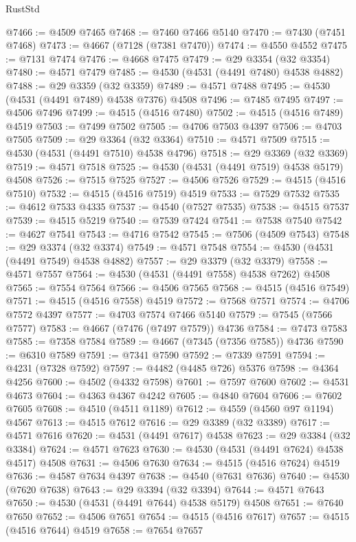 \begin{lexlean}{RustStd}
\begin{coremodule}
{\begin{coremodule}
{{{{{{{{{{{{{{{{{{{{{{{{{{{{{{{{{{{{{{{{{{{{{{{{{{{{{{{@7466 := @4509 @7465
@7468 := @7460 @7466 @5140
@7470 := @7430 (@7451 @7468)
@7473 := @4667 (@7128 (@7381 @7470))
@7474 := @4550 @4552
@7475 := @7131 @7474
@7476 := @4668 @7475
@7479 := @29 @3354 (@32 @3354)
@7480 := @4571 @7479
@7485 := @4530 (@4531 (@4491 @7480) @4538 @4882)
@7488 := @29 @3359 (@32 @3359)
@7489 := @4571 @7488
@7495 := @4530 (@4531 (@4491 @7489) @4538 @7376) @4508
@7496 := @7485 @7495
@7497 := @4506 @7496
@7499 := @4515 (@4516 @7480)
@7502 := @4515 (@4516 @7489) @4519
@7503 := @7499 @7502
@7505 := @4706 @7503 @4397
@7506 := @4703 @7505
@7509 := @29 @3364 (@32 @3364)
@7510 := @4571 @7509
@7515 := @4530 (@4531 (@4491 @7510) @4538 @4796)
@7518 := @29 @3369 (@32 @3369)
@7519 := @4571 @7518
@7525 := @4530 (@4531 (@4491 @7519) @4538 @5179) @4508
@7526 := @7515 @7525
@7527 := @4506 @7526
@7529 := @4515 (@4516 @7510)
@7532 := @4515 (@4516 @7519) @4519
@7533 := @7529 @7532
@7535 := @4612 @7533 @4335
@7537 := @4540 (@7527 @7535)
@7538 := @4515 @7537
@7539 := @4515 @5219
@7540 := @7539 @7424
@7541 := @7538 @7540
@7542 := @4627 @7541
@7543 := @4716 @7542
@7545 := @7506 (@4509 @7543)
@7548 := @29 @3374 (@32 @3374)
@7549 := @4571 @7548
@7554 := @4530 (@4531 (@4491 @7549) @4538 @4882)
@7557 := @29 @3379 (@32 @3379)
@7558 := @4571 @7557
@7564 := @4530 (@4531 (@4491 @7558) @4538 @7262) @4508
@7565 := @7554 @7564
@7566 := @4506 @7565
@7568 := @4515 (@4516 @7549)
@7571 := @4515 (@4516 @7558) @4519
@7572 := @7568 @7571
@7574 := @4706 @7572 @4397
@7577 := @4703 @7574 @7466 @5140
@7579 := @7545 (@7566 @7577)
@7583 := @4667 (@7476 (@7497 @7579)) @4736
@7584 := @7473 @7583
@7585 := @7358 @7584
@7589 := @4667 (@7345 (@7356 @7585)) @4736
@7590 := @6310 @7589
@7591 := @7341 @7590
@7592 := @7339 @7591
@7594 := @4231 (@7328 @7592)
@7597 := @4482 (@4485 @726) @5376
@7598 := @4364 @4256
@7600 := @4502 (@4332 @7598)
@7601 := @7597 @7600
@7602 := @4531 @4673
@7604 := @4363 @4367 @4242
@7605 := @4840 @7604
@7606 := @7602 @7605
@7608 := @4510 (@4511 @1189)
@7612 := @4559 (@4560 @97 @1194) @4567
@7613 := @4515 @7612
@7616 := @29 @3389 (@32 @3389)
@7617 := @4571 @7616
@7620 := @4531 (@4491 @7617) @4538
@7623 := @29 @3384 (@32 @3384)
@7624 := @4571 @7623
@7630 := @4530 (@4531 (@4491 @7624) @4538 @4517) @4508
@7631 := @4506 @7630
@7634 := @4515 (@4516 @7624) @4519
@7636 := @4587 @7634 @4397
@7638 := @4540 (@7631 @7636)
@7640 := @4530 (@7620 @7638)
@7643 := @29 @3394 (@32 @3394)
@7644 := @4571 @7643
@7650 := @4530 (@4531 (@4491 @7644) @4538 @5179) @4508
@7651 := @7640 @7650
@7652 := @4506 @7651
@7654 := @4515 (@4516 @7617)
@7657 := @4515 (@4516 @7644) @4519
@7658 := @7654 @7657
}}}}}}}}}}}}}}}}}}}}}}}}}}}}}}}}}}}}}}}}}}}}}}}}}}}}}}}
\end{coremodule}}
\end{coremodule}
\end{lexlean}
